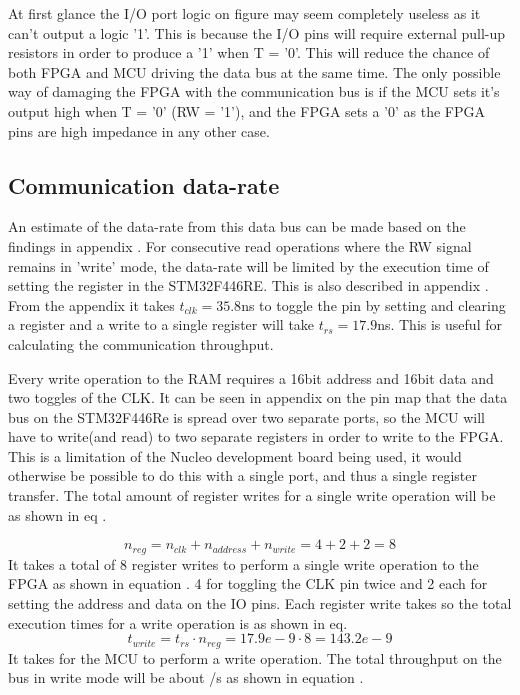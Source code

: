 At first glance the I/O port logic on figure  may seem completely useless as it can't output a logic '1'. This is because the I/O pins will require external pull-up resistors in order to produce a '1' when T = '0'. This will reduce the chance of both FPGA and MCU driving the data bus at the same time. The only possible way of damaging the FPGA with the communication bus is if the MCU sets it's output high when T = '0' (RW = '1'), and the FPGA sets a '0' as the FPGA pins are high impedance in any other case.

\subsection*{Communication data-rate} \label{subsubsec:CommunicationDatarate}

An estimate of the data-rate from this data bus can be made based on the findings in appendix . For consecutive read operations where the RW signal remains in 'write' mode, the data-rate will be limited by the execution time of setting the register in the STM32F446RE. This is also described in appendix . From the appendix it takes $t_{clk} = 35.8$ns to toggle the pin by setting and clearing a register and a write to a single register will take $t_{rs} = 17.9$ns. This is useful for calculating the communication throughput.

Every write operation to the RAM requires a 16bit address and 16bit data and two toggles of the CLK. It can be seen in appendix  on the pin map that the data bus on the STM32F446Re is spread over two separate ports, so the MCU will have to write(and read) to two separate registers in order to write to the FPGA. This is a limitation of the Nucleo development board being used, it would otherwise be possible to do this with a single port, and thus a single register transfer. The total amount of register writes for a single write operation will be as shown in eq .

\begin{equation}\label{eq:7_2_1_Write_ThroughPut}
    n_{reg} = n_{clk} +  n_{address} + n_{write} = 4+2+2 = 8 
\end{equation}
It takes a total of 8 register writes to perform a single write operation to the FPGA as shown in equation . 4 for toggling the CLK pin twice and 2 each for setting the address and data on the IO pins. Each register write takes  so the total execution times for a write operation is  as shown in eq.
\begin{equation}\label{eq:7_2_1_Write_ThroughPutTotalTime}
    t_{write} = t_{rs} \cdot n_{reg} = 17.9e-9 \cdot 8 =  143.2e-9
\end{equation}
It takes  for the MCU to perform a write operation. The total throughput on the bus in write mode will be about /s as shown in equation .

